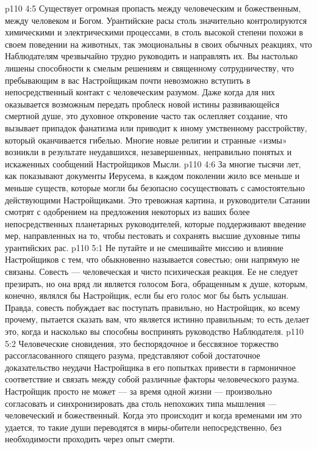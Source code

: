 \vs p110 4:5 \pc Существует огромная пропасть между человеческим и божественным, между человеком и Богом. Урантийские расы столь значительно контролируются химическими и электрическими процессами, в столь высокой степени похожи в своем поведении на животных, так эмоциональны в своих обычных реакциях, что Наблюдателям чрезвычайно трудно руководить и направлять их. Вы настолько лишены способности к смелым решениям и священному сотрудничеству, что пребывающим в вас Настройщикам почти невозможно вступить в непосредственный контакт с человеческим разумом. Даже когда для них оказывается возможным передать проблеск новой истины развивающейся смертной душе, это духовное откровение часто так ослепляет создание, что вызывает припадок фанатизма или приводит к иному умственному расстройству, который оканчивается гибелью. Многие новые религии и странные «измы» возникли в результате неудавшихся, незавершенных, неправильно понятых и искаженных сообщений Настройщиков Мысли.
\vs p110 4:6 За многие тысячи лет, как показывают документы Иерусема, в каждом поколении жило все меньше и меньше существ, которые могли бы безопасно сосуществовать с самостоятельно действующими Настройщиками. Это тревожная картина, и руководители Сатании смотрят с одобрением на предложения некоторых из ваших более непосредственных планетарных руководителей, которые поддерживают введение мер, направленных на то, чтобы пестовать и сохранять высшие духовные типы урантийских рас.
\vs p110 5:1 Не путайте и не смешивайте миссию и влияние Настройщиков с тем, что обыкновенно называется совестью; они напрямую не связаны. Совесть --- человеческая и чисто психическая реакция. Ее не следует презирать, но она вряд ли является голосом Бога, обращенным к душе, которым, конечно, являлся бы Настройщик, если бы его голос мог бы быть услышан. Правда, совесть побуждает вас поступать правильно, но Настройщик, ко всему прочему, пытается сказать вам, что является истинно правильным; то есть делает это, когда и насколько вы способны воспринять руководство Наблюдателя.
\vs p110 5:2 \pc Человеческие сновидения, это беспорядочное и бессвязное торжество рассогласованного спящего разума, представляют собой достаточное доказательство неудачи Настройщика в его попытках привести в гармоничное соответствие и связать между собой различные факторы человеческого разума. Настройщик просто не может --- за время одной жизни --- произвольно согласовать и синхронизировать два столь непохожих типа мышления --- человеческий и божественный. Когда это происходит и когда временами им это удается, то такие души переводятся в миры\hyp{}обители непосредственно, без необходимости проходить через опыт смерти.
